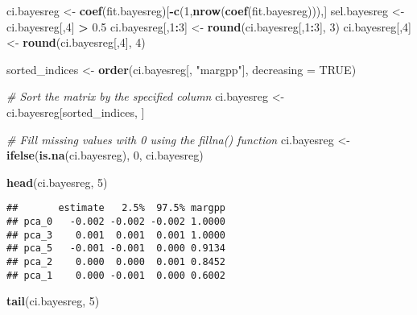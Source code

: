 \documentclass[
]{article}
\newenvironment{Shaded}{\begin{snugshade}}{\end{snugshade}}
\newcommand{\AttributeTok}[1]{\textcolor[rgb]{0.13,0.29,0.53}{#1}}
\newcommand{\CommentTok}[1]{\textcolor[rgb]{0.56,0.35,0.01}{\textit{#1}}}
\newcommand{\ConstantTok}[1]{\textcolor[rgb]{0.56,0.35,0.01}{#1}}
\newcommand{\DecValTok}[1]{\textcolor[rgb]{0.00,0.00,0.81}{#1}}
\newcommand{\FloatTok}[1]{\textcolor[rgb]{0.00,0.00,0.81}{#1}}
\newcommand{\FunctionTok}[1]{\textcolor[rgb]{0.13,0.29,0.53}{\textbf{#1}}}
\newcommand{\NormalTok}[1]{#1}
\newcommand{\OtherTok}[1]{\textcolor[rgb]{0.56,0.35,0.01}{#1}}
\newcommand{\SpecialCharTok}[1]{\textcolor[rgb]{0.81,0.36,0.00}{\textbf{#1}}}
\newcommand{\StringTok}[1]{\textcolor[rgb]{0.31,0.60,0.02}{#1}}
\begin{document}
\begin{Shaded}
\begin{Highlighting}[]
\NormalTok{ci.bayesreg }\OtherTok{\textless{}{-}} \FunctionTok{coef}\NormalTok{(fit.bayesreg)[}\SpecialCharTok{{-}}\FunctionTok{c}\NormalTok{(}\DecValTok{1}\NormalTok{,}\FunctionTok{nrow}\NormalTok{(}\FunctionTok{coef}\NormalTok{(fit.bayesreg))),]}
\NormalTok{sel.bayesreg }\OtherTok{\textless{}{-}}\NormalTok{ ci.bayesreg[,}\DecValTok{4}\NormalTok{] }\SpecialCharTok{\textgreater{}} \FloatTok{0.5}
\NormalTok{ci.bayesreg[,}\DecValTok{1}\SpecialCharTok{:}\DecValTok{3}\NormalTok{] }\OtherTok{\textless{}{-}} \FunctionTok{round}\NormalTok{(ci.bayesreg[,}\DecValTok{1}\SpecialCharTok{:}\DecValTok{3}\NormalTok{], }\DecValTok{3}\NormalTok{)  }
\NormalTok{ci.bayesreg[,}\DecValTok{4}\NormalTok{] }\OtherTok{\textless{}{-}} \FunctionTok{round}\NormalTok{(ci.bayesreg[,}\DecValTok{4}\NormalTok{], }\DecValTok{4}\NormalTok{)      }

\NormalTok{sorted\_indices }\OtherTok{\textless{}{-}} \FunctionTok{order}\NormalTok{(ci.bayesreg[, }\StringTok{"margpp"}\NormalTok{], }\AttributeTok{decreasing =} \ConstantTok{TRUE}\NormalTok{)}

\CommentTok{\# Sort the matrix by the specified column}
\NormalTok{ci.bayesreg }\OtherTok{\textless{}{-}}\NormalTok{ ci.bayesreg[sorted\_indices, ]}

\CommentTok{\# Fill missing values with 0 using the fillna() function}
\NormalTok{ci.bayesreg }\OtherTok{\textless{}{-}} \FunctionTok{ifelse}\NormalTok{(}\FunctionTok{is.na}\NormalTok{(ci.bayesreg), }\DecValTok{0}\NormalTok{, ci.bayesreg)}
\end{Highlighting}
\end{Shaded}

\begin{Shaded}
\begin{Highlighting}[]
\FunctionTok{head}\NormalTok{(ci.bayesreg, }\DecValTok{5}\NormalTok{)}
\end{Highlighting}
\end{Shaded}

\begin{verbatim}
##       estimate   2.5%  97.5% margpp
## pca_0   -0.002 -0.002 -0.002 1.0000
## pca_3    0.001  0.001  0.001 1.0000
## pca_5   -0.001 -0.001  0.000 0.9134
## pca_2    0.000  0.000  0.001 0.8452
## pca_1    0.000 -0.001  0.000 0.6002
\end{verbatim}

\begin{Shaded}
\begin{Highlighting}[]
\FunctionTok{tail}\NormalTok{(ci.bayesreg, }\DecValTok{5}\NormalTok{)}
\end{Highlighting}
\end{Shaded}
\end{document}
